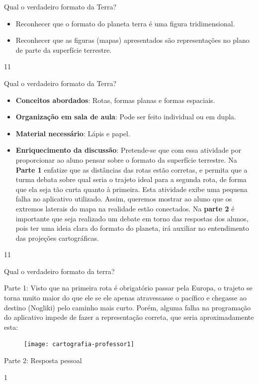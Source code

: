 \clearmargin
\begin{objectives}{Qual o verdadeiro formato da Terra?}
{
	\begin{itemize}
	\item Reconhecer que o formato do planeta terra é uma figura tridimensional.
	\item Reconhecer que as figuras (mapas) apresentados são representações no plano de parte da superfície terrestre.

	\end{itemize}
}{1}{1}
\end{objectives}
\begin{sugestions}{Qual o verdadeiro formato da Terra?}
{
	\begin{itemize}
	\item \textbf{Conceitos abordados}: Rotas, formas planas e formas espaciais.
	\item  \textbf{Organização em sala de aula}: Pode ser feito individual ou em dupla.
	\item \textbf{Material necessário}: Lápis e papel.
	\item \textbf{Enriquecimento da discussão}: Pretende-se que com essa atividade por proporcionar ao aluno pensar sobre o formato da superfície terrestre. Na \textbf{Parte 1} enfatize que as distâncias das rotas estão corretas, e permita que a turma debata sobre qual seria o trajeto ideal para a segunda rota, de forma que ela seja tão curta quanto à primeira.	Esta atividade exibe uma pequena falha no aplicativo utilizado. Assim, queremos mostrar ao aluno que os extremos laterais do mapa na realidade estão conectados. Na \textbf{parte 2} é importante que seja realizado um debate em torno das respostas dos alunos, pois  ter uma ideia clara do formato do planeta, irá auxiliar no entendimento das projeções cartográficas.
	
	\end{itemize}
}{1}{1}
\end{sugestions}
\begin{answer}{Qual o verdadeiro formato da terra?}
{
	Parte 1: Visto que na primeira rota é obrigatório passar pela Europa, o trajeto se torna muito maior do que ele se ele apenas atravessasse o pacífico e chegasse ao destino (Nogliki) pelo caminho mais curto. Porém, alguma falha na programação do aplicativo impede de fazer a representação correta, que seria aproximadamente esta:
	\begin{figure}[H]
	\centering
	
	\texttt{[image: cartografia-professor1]}
	\end{figure}

	Parte 2: Resposta pessoal
}{1}
\end{answer}
